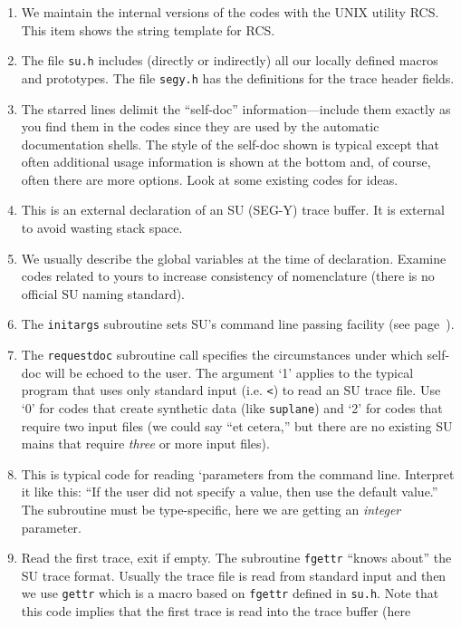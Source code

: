 {{{{{{{\begin{enumerate}
\item We maintain the internal versions of the codes with the UNIX utility {\sf RCS}.  This item shows the string template for {\sf RCS}.
\item The file {\tt su.h} includes (directly or indirectly) all our locally defined 
macros and prototypes.  The file {\tt segy.h} has the definitions for the trace header 
fields.
\item The starred lines delimit the ``self-doc'' information---include them exactly as 
you find them in the codes since they are used by the automatic documentation shells.  
The style of the self-doc shown is typical except that often additional usage information 
is shown at the bottom and, of course, often there are more options.  Look at some 
existing codes for ideas.
\item This is an external declaration of an {\small\sf SU} ({\sf SEG-Y}) trace buffer.  
It is external to avoid wasting stack space.
\item We usually describe the global variables at the time of declaration.
Examine codes related to yours to increase consistency of nomenclature
(there is no official {\small\sf SU} naming standard).
\item The {\tt initargs} subroutine sets {\small\sf SU}'s command line passing 
facility (see page~\pageref{SU:page:getpar}).
\item The {\tt requestdoc} subroutine call specifies the circumstances under which 
self-doc will be echoed to the user.  The argument `1' applies to the  typical program that uses only standard input (i.e. \verb+<+) to read an {\small\sf SU} trace file.  Use `0' for 
codes that create synthetic data (like {\tt suplane}) and `2' for codes that require 
two input files (we could say ``et cetera,'' but there are no existing {\small\sf SU} 
mains that require {\em three} or more input files).
\item This is typical code for reading `parameters from the command line.  
Interpret it like this: ``If the user did not specify a value, then use the default value.''  The subroutine must be type-specific, here we are getting an {\em integer} parameter.
\item Read the first trace, exit if empty.  The subroutine {\tt fgettr} ``knows about'' 
the {\small\sf SU} trace format.  Usually the trace file is read from standard input and then we use {\tt gettr} which is a macro based on {\tt fgettr} defined in {\tt su.h}.  Note 
that this code implies that the first trace is read into the trace buffer (here 

\end{enumerate}}}}}}}}

